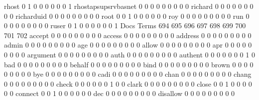 \documentclass[compress,8pt]{beamer}
\begin{document}
\begin{frame}
\begin{Schunk}
  rhost                                      0   1   0   0   0   0   0   0   1
  rhostapsupsrvbasnet                        0   0   0   0   0   0   0   0   0
  richard                                    0   0   0   0   0   0   0   0   0
  richarduid                                 0   0   0   0   0   0   0   0   0
  root                                       0   0   1   0   0   0   0   0   0
  roy                                        0   0   0   0   0   0   0   0   0
  run                                        0   0   0   0   0   0   0   0   0
  ruser                                      0   1   0   0   0   0   0   0   1
                                          Docs
Terms                                      694 695 696 697 698 699 700 701 702
  accept                                     0   0   0   0   0   0   0   0   0
  access                                     0   0   0   0   0   0   0   0   0
  address                                    0   0   0   0   0   0   0   0   0
  admin                                      0   0   0   0   0   0   0   0   0
  age                                        0   0   0   0   0   0   0   0   0
  allow                                      0   0   0   0   0   0   0   0   0
  apr                                        0   0   0   0   0   0   0   0   0
  argument                                   0   0   0   0   0   0   0   0   0
  auth                                       0   0   0   0   0   0   0   0   0
  authent                                    0   0   0   0   0   0   0   1   0
  bad                                        0   0   0   0   0   0   0   0   0
  behalf                                     0   0   0   0   0   0   0   0   0
  bind                                       0   0   0   0   0   0   0   0   0
  brown                                      0   0   0   0   0   0   0   0   0
  bye                                        0   0   0   0   0   0   0   0   0
  cadi                                       0   0   0   0   0   0   0   0   0
  chan                                       0   0   0   0   0   0   0   0   0
  chang                                      0   0   0   0   0   0   0   0   0
  check                                      0   0   0   0   0   0   1   0   0
  clark                                      0   0   0   0   0   0   0   0   0
  close                                      0   0   1   0   0   0   0   0   0
  connect                                    0   0   1   0   0   0   0   0   0
  dec                                        0   0   0   0   0   0   0   0   0
  disallow                                   0   0   0   0   0   0   0   0   0

\end{Schunk}
\end{frame}
\end{document}
